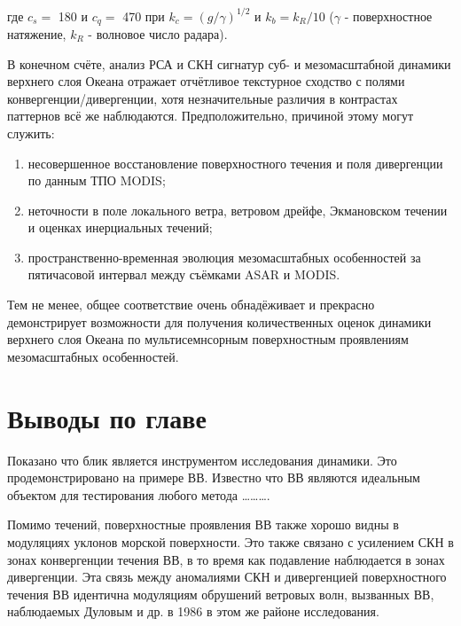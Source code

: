 {\noindent где $c_{s} =$ 180 и $c_{q} =$ 470 при $k_{c} =(g/\gamma )^{1/2} $ и $k_{b} =k_{R} /10$ ($\gamma $ - поверхностное натяжение, $k_{R} $ - волновое число радара).

В конечном счёте, анализ РСА и СКН сигнатур суб- и мезомасштабной динамики верхнего слоя Океана отражает отчётливое текстурное сходство с полями конвергенции/дивергенции, хотя незначительные различия в контрастах паттернов всё же наблюдаются. Предположительно, причиной этому могут служить:

\begin{enumerate}
\item  несовершенное восстановление поверхностного течения и поля дивергенции по данным ТПО MODIS;

\item  неточности в поле локального ветра, ветровом дрейфе, Экмановском течении и оценках инерциальных течений;

\item  пространственно-временная эволюция мезомасштабных особенностей за пятичасовой интервал между съёмками ASAR и MODIS.
\end{enumerate}

Тем не менее, общее соответствие очень обнадёживает и прекрасно демонстрирует возможности для получения количественных оценок динамики верхнего слоя Океана по мультисемнсорным поверхностным проявлениям мезомасштабных особенностей.



\newpage


\section{Выводы по главе} \label{sec:3.4}


Показано что блик является инструментом исследования динамики. Это продемонстрировано на примере ВВ. Известно что ВВ являются идеальным объектом для тестирования любого метода \dots \dots \dots .

Помимо течений, поверхностные проявления ВВ также хорошо видны в модуляциях уклонов морской поверхности. Это также связано с усилением СКН в зонах конвергенции течения ВВ, в то время как подавление наблюдается в зонах дивергенции. Эта связь между аномалиями СКН и дивергенцией поверхностного течения ВВ идентична модуляциям обрушений ветровых волн, вызванных ВВ, наблюдаемых Дуловым и др. в 1986 \citep{1986} в этом же районе исследования.



}
